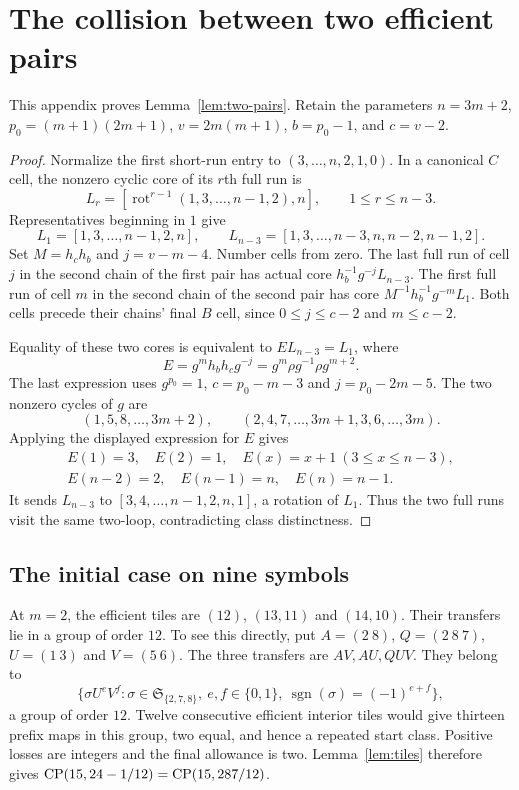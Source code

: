 \section{The collision between two efficient pairs}\label{app:full-collision}

This appendix proves Lemma~\ref{lem:two-pairs}. Retain the parameters
$n=3m+2$, $p_0=(m+1)(2m+1)$, $v=2m(m+1)$, $b=p_0-1$, and $c=v-2$.

\begin{proof}
Normalize the first short-run entry to $(3,\ldots,n,2,1,0)$.
In a canonical $C$ cell, the nonzero cyclic core of its $r$th full run is
\[
 L_r=[\operatorname{rot}^{r-1}(1,3,\ldots,n-1,2),n],
 \qquad 1\le r\le n-3.
\]
Representatives beginning in $1$ give
\[
 L_1=[1,3,\ldots,n-1,2,n],\qquad
 L_{n-3}=[1,3,\ldots,n-3,n,n-2,n-1,2].
\]
Set $M=h_ch_b$ and $j=v-m-4$. Number cells from zero. The last full
run of cell $j$ in the second chain of the first pair has actual core
$h_b^{-1}g^{-j}L_{n-3}$. The first full run of cell $m$ in the second
chain of the second pair has core $M^{-1}h_b^{-1}g^{-m}L_1$.
Both cells precede their chains' final $B$ cell, since
$0\le j\le c-2$ and $m\le c-2$.

Equality of these two cores is equivalent to $EL_{n-3}=L_1$, where
\[
 E=g^mh_bh_cg^{-j}=g^m\rho g^{-1}\rho g^{m+2}.
\]
The last expression uses $g^{p_0}=1$, $c=p_0-m-3$ and
$j=p_0-2m-5$. The two nonzero cycles of $g$ are
\[
 (1,5,8,\ldots,3m+2),\qquad
 (2,4,7,\ldots,3m+1,3,6,\ldots,3m).
\]
Applying the displayed expression for $E$ gives
\[
\begin{gathered}
 E(1)=3,\quad E(2)=1,\quad E(x)=x+1\ (3\le x\le n-3),\\
 E(n-2)=2,\quad E(n-1)=n,\quad E(n)=n-1.
\end{gathered}
\]
It sends $L_{n-3}$ to $[3,4,\ldots,n-1,2,n,1]$, a rotation of $L_1$.
Thus the two full runs visit the same two-loop, contradicting class
distinctness.
\end{proof}

\subsection{The initial case on nine symbols}

At $m=2$, the efficient tiles are $(12)$, $(13,11)$ and $(14,10)$.
Their transfers lie in a group of order $12$. To see this directly, put
$A=(2\ 8)$, $Q=(2\ 8\ 7)$, $U=(1\ 3)$ and $V=(5\ 6)$.
The three transfers are $AV,AU,QUV$. They belong to
\[
 \{\sigma U^eV^f:
 \sigma\in\mathfrak S_{\{2,7,8\}},\ e,f\in\{0,1\},\
 \operatorname{sgn}(\sigma)=(-1)^{e+f}\},
\]
a group of order $12$. Twelve consecutive efficient interior tiles
would give thirteen prefix maps in this group, two equal, and hence
a repeated start class. Positive losses are integers and the final
allowance is two. Lemma~\ref{lem:tiles} therefore gives
$\operatorname{CP}(15,24-1/12)=\operatorname{CP}(15,287/12)$.

